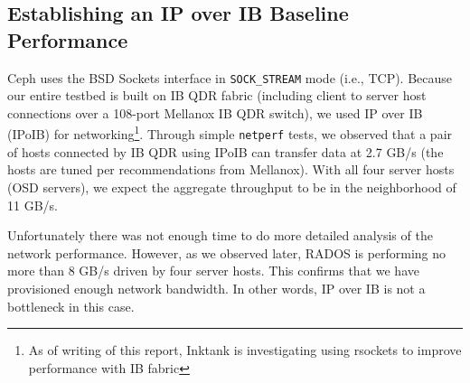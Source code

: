 \subsection{Establishing an IP over IB Baseline Performance}

Ceph uses the BSD Sockets interface in \texttt{SOCK\_STREAM} mode (i.e., TCP).
Because our entire testbed is built on IB QDR fabric (including client to
server host connections over a 108-port Mellanox IB QDR switch), we used IP
over IB (IPoIB) for networking\footnote{As of writing of this report, Inktank
is investigating using rsockets to improve performance with IB fabric}. Through
simple \verb!netperf! tests, we observed that a pair of hosts connected by IB
QDR using IPoIB can transfer data at 2.7 GB/s (the hosts are tuned per
recommendations from Mellanox). With all four server hosts (OSD servers), we
expect the aggregate throughput to be in the neighborhood of 11 GB/s.

Unfortunately there was not enough time to do more detailed analysis of the
network performance. However, as we observed later, RADOS is performing no
more than 8 GB/s driven by four server hosts. This confirms that we have
provisioned enough network bandwidth. In other words, IP over IB is not a
bottleneck in this case.

